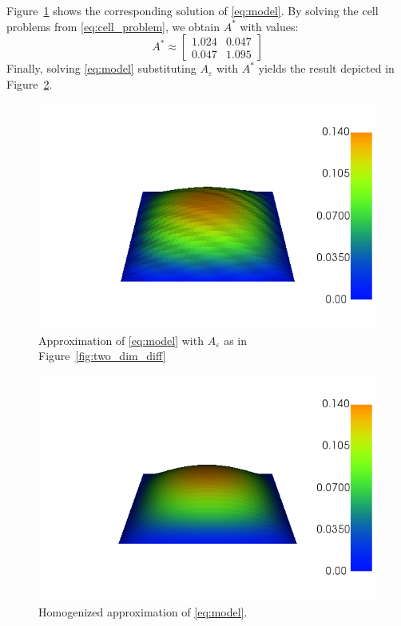 \documentclass{article}
\renewcommand{\epsilon}{\varepsilon}
\begin{document}
Figure~\ref{fig:two_dim_approx} shows the corresponding solution of \eqref{eq:model}.
By solving the cell problems from \eqref{eq:cell_problem},  we obtain $A^*$ with values:
\begin{equation}
    A^* \approx \begin{bmatrix}
        1.024 & 0.047\\
        0.047 & 1.095
    \end{bmatrix}
\end{equation}
Finally, solving \eqref{eq:model} substituting $A_\epsilon$ with $A^*$ yields the result depicted in Figure~\ref{fig:two_dim_homog_approx}.
\begin{figure}[h]
    \centering
    \includegraphics[width=0.8\linewidth]{two_dim_approx.png}
    \caption{Approximation of \eqref{eq:model} with $A_\epsilon$ as in Figure~\ref{fig:two_dim_diff}}
    \label{fig:two_dim_approx}
\end{figure}
\begin{figure}[h]
    \centering
    \includegraphics[width=0.8\linewidth]{two_dim_homog_approx.png}
    \caption{Homogenized approximation of \eqref{eq:model}.}
    \label{fig:two_dim_homog_approx}
 \end{figure}
\end{document}
